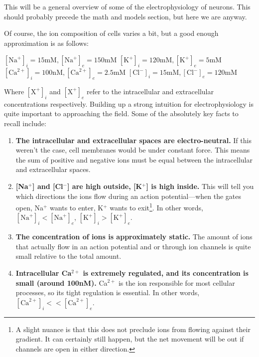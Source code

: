 \label{sec:EPhys}

This will be a general overview of some of the electrophysiology of neurons. This should probably precede the math and models section, but here we are anyway.\newline

Of course, the ion composition of cells varies a bit, but a good enough approximation is as follows:\newline 


\hspace*{1cm} $[\mathrm{Na}^+]_i = 15\mathrm{mM}, [\mathrm{Na}^+]_e = 150\mathrm{mM}$\newline
\hspace*{1cm} $[\mathrm{K}^+]_i = 120\mathrm{mM}, [\mathrm{K}^+]_e = 5\mathrm{mM}$ \newline
\hspace*{1cm} $[\mathrm{Ca}^{2+}]_i = 100\mathrm{nM}, 
[\mathrm{Ca}^{2+}]_e = 2.5\mathrm{mM}$\newline
\hspace*{1cm} $[\mathrm{Cl}^-]_i = 15\mathrm{mM}, [\mathrm{Cl}^-]_e = 120\mathrm{mM}$ 
\newline

Where $[\mathrm{X}^+]_i$ and $[\mathrm{X}^+]_e$ refer to the intracellular and extracellular concentrations respectively. Building up a strong intuition for electrophysiology is quite important to approaching the field. Some of the absolutely key facts to recall include:

\begin{enumerate}
\item \textbf{The intracellular and extracellular spaces are electro-neutral.} If this weren't the case, cell membranes would be under constant force. This means the sum of positive and negative ions must be equal between the intracellular and extracellular spaces. 
\item \textbf{[Na$^+$] and [Cl$^-$] are high outside, [K$^+$] is high inside.} This will tell you which directions the ions flow during an action potential---when the gates open, Na$^+$ wants to enter, K$^+$ wants to exit\footnote{A slight nuance is that this does not preclude ions from flowing against their gradient. It can certainly still happen, but the net movement will be out if channels are open in either direction.}. In other words, $[\mathrm{Na}^+]_i < [\mathrm{Na}^+]_e$, $[\mathrm{K}^+]_i > [\mathrm{K}^+]_e$.  
\item \textbf{The concentration of ions is approximately static.} The amount of ions that actually flow in an action potential and or through ion channels is quite small relative to the total amount.
\item \textbf{Intracellular Ca$^{2+}$ is extremely regulated, and its concentration is small (around 100nM).} Ca$^{2+}$ is the ion responsible for most cellular processes, so its tight regulation is essential. In other words, $[\mathrm{Ca}^{2+}]_i << [\mathrm{Ca}^{2+}]_e$. 
\end{enumerate}

